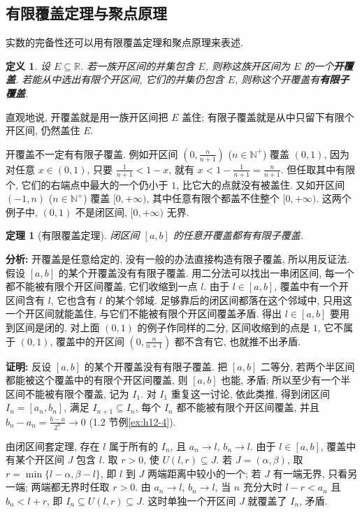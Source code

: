 \documentclass[UTF8,openany]{ctexbook}
\theoremstyle{chinesetextbook}
\newtheorem{definition}{定义}[section]
\newtheorem{theorem}{定理}[section]
\newenvironment{cnproof}{\par\indent\textbf{证明:} \ignorespaces}{\par}
\begin{document}
\subsection{有限覆盖定理与聚点原理}
实数的完备性还可以用有限覆盖定理和聚点原理来表述.
\begin{definition}
设 $E\subseteq\mathbb R$. 若一族开区间的并集包含 $E$, 则称这族开区间为 $E$ 的一个\textbf{开覆盖}. 若能从中选出有限个开区间, 它们的并集仍包含 $E$, 则称这个开覆盖有\textbf{有限子覆盖}.
\end{definition}
直观地说, 开覆盖就是用一族开区间把 $E$ 盖住; 有限子覆盖就是从中只留下有限个开区间, 仍然盖住 $E$.

开覆盖不一定有有限子覆盖. 例如开区间 $\displaystyle\left(0,\frac n{n+1}\right)$ ($n\in\mathbb N^+$) 覆盖 $(0,1)$, 因为对任意 $x\in(0,1)$, 只要 $\displaystyle\frac1{n+1}<1-x$, 就有 $\displaystyle x<1-\frac1{n+1}=\frac n{n+1}$. 但任取其中有限个, 它们的右端点中最大的一个仍小于 $1$, 比它大的点就没有被盖住. 又如开区间 $(-1,n)$ ($n\in\mathbb N^+$) 覆盖 $[0,+\infty)$, 其中任意有限个都盖不住整个 $[0,+\infty)$. 这两个例子中, $(0,1)$ 不是闭区间, $[0,+\infty)$ 无界.
\begin{theorem}[有限覆盖定理]
闭区间 $[a,b]$ 的任意开覆盖都有有限子覆盖.
\end{theorem}
\par\indent\textbf{分析:} 开覆盖是任意给定的, 没有一般的办法直接构造有限子覆盖, 所以用反证法. 假设 $[a,b]$ 的某个开覆盖没有有限子覆盖. 用二分法可以找出一串闭区间, 每一个都不能被有限个开区间覆盖, 它们收缩到一点 $l$. 由于 $l\in[a,b]$, 覆盖中有一个开区间含有 $l$, 它也含有 $l$ 的某个邻域. 足够靠后的闭区间都落在这个邻域中, 只用这一个开区间就能盖住, 与它们不能被有限个开区间覆盖矛盾. 得出 $l\in[a,b]$ 要用到区间是闭的. 对上面 $(0,1)$ 的例子作同样的二分, 区间收缩到的点是 $1$, 它不属于 $(0,1)$, 覆盖中的开区间 $\displaystyle\left(0,\frac n{n+1}\right)$ 都不含有它, 也就推不出矛盾.
\begin{cnproof}
反设 $[a,b]$ 的某个开覆盖没有有限子覆盖. 把 $[a,b]$ 二等分, 若两个半区间都能被这个覆盖中的有限个开区间覆盖, 则 $[a,b]$ 也能, 矛盾; 所以至少有一个半区间不能被有限个覆盖, 记为 $I_1$. 对 $I_1$ 重复这一讨论, 依此类推, 得到闭区间 $I_n=[a_n,b_n]$, 满足 $I_{n+1}\subseteq I_n$, 每个 $I_n$ 都不能被有限个开区间覆盖, 并且 $\displaystyle b_n-a_n=\frac{b-a}{2^n}\to0$ (1.2 节例\ref{ex:h12-4}).

由闭区间套定理, 存在 $l$ 属于所有的 $I_n$, 且 $a_n\to l$, $b_n\to l$. 由于 $l\in[a,b]$, 覆盖中有某个开区间 $J$ 包含 $l$. 取 $r>0$, 使 $U(l,r)\subseteq J$. 若 $J=(\alpha,\beta)$, 取 $r=\min\{l-\alpha,\beta-l\}$, 即 $l$ 到 $J$ 两端距离中较小的一个; 若 $J$ 有一端无界, 只看另一端; 两端都无界时任取 $r>0$. 由 $a_n\to l$, $b_n\to l$, 当 $n$ 充分大时 $l-r<a_n$ 且 $b_n<l+r$, 即 $I_n\subseteq U(l,r)\subseteq J$. 这时单独一个开区间 $J$ 就覆盖了 $I_n$, 矛盾.
\end{cnproof}
\end{document}
